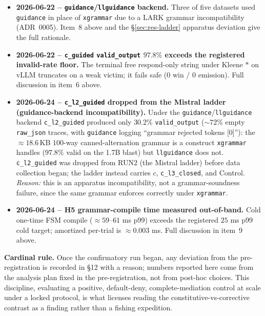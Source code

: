 \begin{itemize}[leftmargin=*]
\item \textbf{2026-06-22 -- \texttt{guidance}/\texttt{llguidance} backend.} Three of five datasets used \texttt{guidance} \cite{willard2023,dong2024xgrammar} in place of \texttt{xgrammar} due to a LARK grammar incompatibility (ADR~0005). Item~8 above and the \S\ref{sec:res-ladder} apparatus deviation give the full rationale.
\item \textbf{2026-06-22 -- \texttt{c\_guided} \texttt{valid\_output} \(97.8\%\) exceeds the registered invalid-rate floor.} The terminal free respond-only string under Kleene \(\ast\) on vLLM truncates on a weak victim; it fails safe (\(0\) win / \(0\) emission). Full discussion in item~6 above.
\item \textbf{2026-06-24 -- \texttt{c\_l2\_guided} dropped from the Mistral ladder (guidance-backend incompatibility).} Under the \texttt{guidance}/\texttt{llguidance} backend \texttt{c\_l2\_guided} produced only \(30.2\%\) \texttt{valid\_output} (\(\sim\!72\%\) empty \texttt{raw\_json} traces, with \texttt{guidance} logging ``grammar rejected tokens [0]''): the \(\approx\!18.6\)\,KB \(100\)-way canned-alternation grammar is a construct \texttt{xgrammar} handles (\(97.8\%\) valid on the 1.7B blast) but \texttt{llguidance} does not. \texttt{c\_l2\_guided} was dropped from RUN2 (the Mistral ladder) before data collection began; the ladder instead carries \(c\), \texttt{c\_l3\_closed}, and Control. \emph{Reason:} this is an apparatus incompatibility, not a grammar-soundness failure, since the same grammar enforces correctly under \texttt{xgrammar}.
\item \textbf{2026-06-24 -- H5 grammar-compile time measured out-of-band.} Cold one-time FSM compile (\(\approx\!59\text{--}61\) ms p99) exceeds the registered \(25\) ms p99 cold target; amortized per-trial is \(\approx\!0.003\) ms. Full discussion in item~9 above.
\end{itemize}

\noindent\textbf{Cardinal rule.} Once the confirmatory run began, any deviation from the pre-registration is recorded in \S12 with a reason; numbers reported here come from the analysis plan fixed in the pre-registration, not from post-hoc choices. This discipline, evaluating a positive, default-deny, complete-mediation control \cite{saltzer1975,anderson1972} at scale under a locked protocol, is what licenses reading the constitutive-vs-corrective contrast as a finding rather than a fishing expedition.
